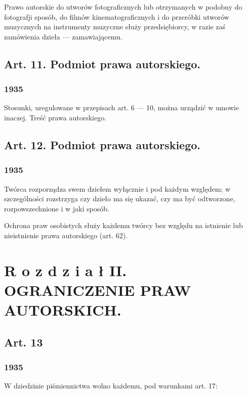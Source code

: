 \documentclass[withmarginpar]{book}
\begin{document}
Prawo autorskie do utworów fotograficznych lub otrzymanych w podobny
do fotografji sposób, do filmów kinematograficznych i do przeróbki
utworów muzycznych na instrumenty muzyczne służy przedsiębiorcy, w
razie zaś zamówienia dzieła — zamawiającemu.

\section{Art.  11. Podmiot prawa autorskiego.}
\label{sec:art.-11}

\subsection{1935}
\label{sec:art.-11-1}

Stosunki, uregulowane w przepisach art. 6 — 10, można urządzić w
umowie inaczej.  Treść prawa autorskiego.


\section{Art.  12. Podmiot prawa autorskiego.}
\label{sec:art.-12}

\subsection{1935}
\label{sec:art.-12-1}

Twórca rozporządza swem dziełem wyłącznie i pod każdym względem; w
szczególności rozstrzyga czy dzieło ma się ukazać, czy ma być
odtworzone, rozpowszechnione i w jaki sposób.

Ochrona praw osobistych służy każdemu twórcy bez względu na istnienie
lub nieistnienie prawa autorskiego (art. 62).

\chapter{R o z d z i a ł   II.
OGRANICZENIE PRAW AUTORSKICH.}
\label{cha:r-o-z}

\section{Art. 13}
\label{sec:art.-13}
\subsection{1935}
\label{sec:art.-13-1}

W dziedzinie piśmiennictwa wolno każdemu, pod warunkami art. 17:
\end{document}
